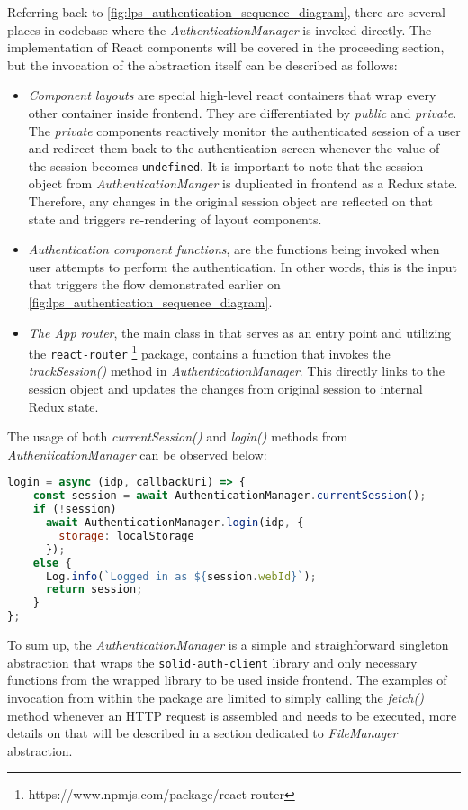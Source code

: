 Referring back to \autoref{fig:lps_authentication_sequence_diagram}, there are several places in \lpa{} codebase where the \textit{AuthenticationManager} is invoked directly. The implementation of React components will be covered in the proceeding section, but the invocation of the abstraction itself can be described as follows:
\begin{itemize}
    \item \textit{Component layouts} are special high-level react containers that wrap every other container inside \lpa{} frontend. They are differentiated by \textit{public} and \textit{private}. The \textit{private} components reactively monitor the authenticated session of a user and redirect them back to the authentication screen whenever the value of the session becomes \texttt{undefined}. It is important to note that the session object from \textit{AuthenticationManger} is duplicated in \lpa{} frontend as a Redux state. Therefore, any changes in the original session object are reflected on that state and triggers re-rendering of layout components. 
    \item \textit{Authentication component functions}, are the functions being invoked when user attempts to perform the authentication. In other words, this is the input that triggers the flow demonstrated earlier on \autoref{fig:lps_authentication_sequence_diagram}.
    \item \textit{The App router}, the main class in \lpa{} that serves as an entry point and utilizing the \texttt{react-router} \footnote{https://www.npmjs.com/package/react-router} package, contains a function that invokes the \textit{trackSession()} method in \textit{AuthenticationManager}. This directly links to the session object and updates the changes from original session to internal Redux state.
\end{itemize}

The usage of both \textit{currentSession()} and \textit{login()} methods from \textit{AuthenticationManager} can be observed below:
\begin{lstlisting}[language=JavaScript]
login = async (idp, callbackUri) => {
    const session = await AuthenticationManager.currentSession();
    if (!session)
      await AuthenticationManager.login(idp, {
        storage: localStorage
      });
    else {
      Log.info(`Logged in as ${session.webId}`);
      return session;
    }
};
\end{lstlisting}

To sum up, the \textit{AuthenticationManager} is a simple and straighforward singleton abstraction that wraps the \texttt{solid-auth-client} library and only necessary functions from the wrapped library to be used inside \lpas{} frontend. The examples of invocation from within the \lpas{} package are limited to simply calling the \textit{fetch()} method whenever an HTTP request is assembled and needs to be executed, more details on that will be described in a section dedicated to \textit{FileManager} abstraction.  

